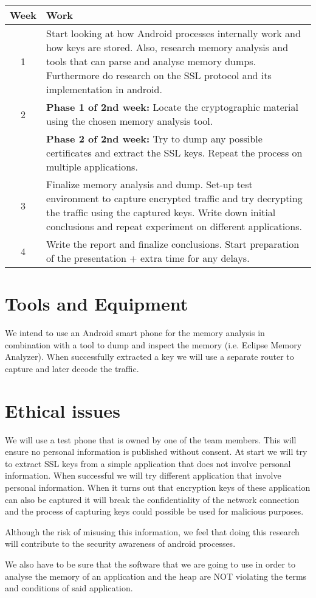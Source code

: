 \documentclass[11pt]{article}
\begin{document}
\begin{center}
\begin{tabular}{ | c | m{11cm}|  } 
\hline
Week & Work \\ 
\hline
1 & Start looking at how Android processes internally work and how keys are stored. Also, research memory analysis and tools that can parse and analyse memory dumps. Furthermore do research on the SSL protocol and its implementation in android. \\ 
\hline
2 & \textbf{Phase 1 of 2nd week:} Locate the cryptographic material using the chosen memory analysis tool.\\
& \textbf{Phase 2 of 2nd week:} Try to dump any possible certificates and extract the SSL keys. Repeat the process on multiple applications.\\ 
\hline
3 & Finalize memory analysis and dump. Set-up test environment to capture encrypted traffic and try decrypting the traffic using the captured keys. Write down initial conclusions and repeat experiment on different applications.  \\ 
\hline
4 & Write the report and finalize conclusions. Start preparation of the presentation + extra time for any delays. \\
\hline
\end{tabular}
\end{center}

\clearpage

\section{Tools and Equipment}
We intend to use an Android smart phone for the memory analysis in combination with a tool to dump and inspect the memory (i.e. Eclipse Memory Analyzer). When successfully extracted a key we will use a separate router to capture and later decode the traffic. 

\section{Ethical issues}
We will use a test phone that is owned by one of the team members. This will ensure no personal information is published without consent. At start we will try to extract SSL keys from a simple application that does not involve personal information. When successful we will try different application that involve personal information. When it turns out that encryption keys of these application can also be captured it will break the confidentiality of the network connection and the process of capturing keys could possible be used for malicious purposes. 

Although the risk of misusing this information, we feel that doing this research will contribute to the security awareness of android processes.

We also have to be sure that the software that we are going to use in order to analyse the memory of an application and the heap are NOT violating the terms and conditions of said application. 



\end{document}
